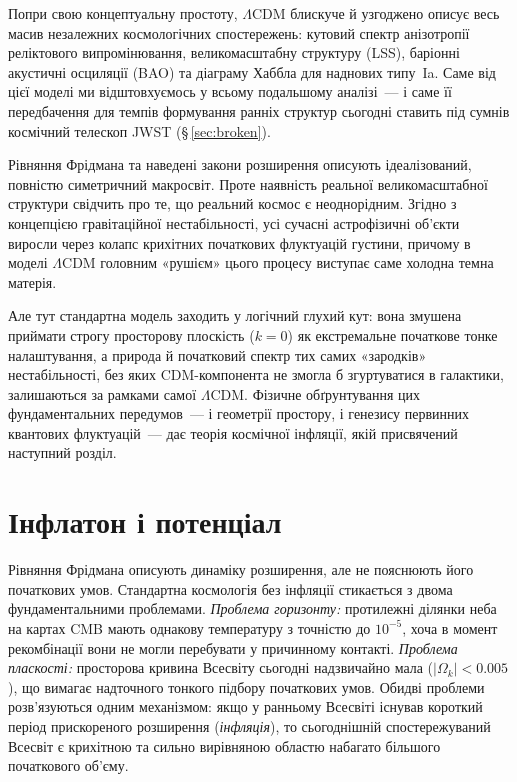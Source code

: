 \documentclass[12pt, a4paper]{article}
\begin{document}
Попри свою концептуальну простоту, $\Lambda$CDM блискуче й узгоджено
описує весь масив незалежних космологічних спостережень: кутовий спектр
анізотропії реліктового випромінювання, великомасштабну структуру (LSS),
баріонні акустичні осциляції (BAO) та діаграму Хаббла для наднових типу~Ia.
Саме від цієї моделі ми відштовхуємось у всьому подальшому аналізі~--- і
саме її передбачення для темпів формування ранніх структур сьогодні
ставить під сумнів космічний телескоп JWST (§\,\ref{sec:broken}).

Рівняння Фрідмана та наведені закони розширення описують ідеалізований,
повністю симетричний макросвіт. Проте наявність реальної великомасштабної
структури свідчить про те, що реальний космос є неоднорідним. Згідно з
концепцією гравітаційної нестабільності, усі сучасні астрофізичні об'єкти
виросли через колапс крихітних початкових флуктуацій густини, причому
в моделі $\Lambda$CDM головним «рушієм» цього процесу виступає саме холодна
темна матерія.

Але тут стандартна модель заходить у логічний глухий кут: вона змушена
приймати строгу просторову плоскість ($k=0$) як екстремальне початкове
тонке налаштування, а природа й початковий спектр тих самих «зародків»
нестабільності, без яких CDM-компонента не змогла б згуртуватися в галактики,
залишаються за рамками самої $\Lambda$CDM. Фізичне обґрунтування цих
фундаментальних передумов~--- і геометрії простору, і генезису первинних
квантових флуктуацій~--- дає теорія космічної інфляції, якій присвячений
наступний розділ.


\section{Інфлатон і потенціал}
\label{sec:inflaton}

Рівняння Фрідмана описують динаміку розширення, але не пояснюють
його початкових умов. Стандартна космологія без інфляції стикається
з двома фундаментальними проблемами. \emph{Проблема горизонту:}
протилежні ділянки неба на картах CMB мають однакову температуру
з точністю до $10^{-5}$, хоча в момент рекомбінації вони не могли
перебувати у причинному контакті. \emph{Проблема пласкості:}
просторова кривина Всесвіту сьогодні надзвичайно мала
($|\Omega_k| < 0.005$), що вимагає надточного тонкого підбору
початкових умов. Обидві проблеми розв'язуються одним механізмом:
якщо у ранньому Всесвіті існував короткий період прискореного
розширення (\emph{інфляція}), то сьогоднішній спостережуваний
Всесвіт є крихітною та сильно вирівняною областю набагато більшого
початкового об'єму.
\end{document}
